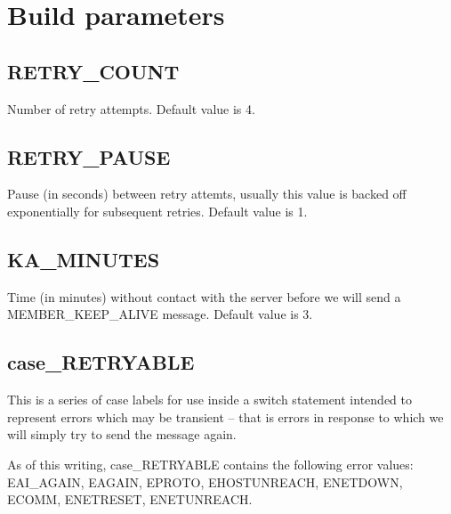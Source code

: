\documentclass{article}
\begin{document}
\section{Build parameters}
\label{sec:build}
\subsection{RETRY\_COUNT}
Number of retry attempts. Default value is 4.
\subsection{RETRY\_PAUSE}
Pause (in seconds) between retry attemts, usually this value is backed off
exponentially for subsequent retries. Default value is 1.
\subsection{KA\_MINUTES}
Time (in minutes) without contact with the server before we will send a
MEMBER\_KEEP\_ALIVE message. Default value is 3.
\subsection{case\_RETRYABLE}
\label{def:case}
This is a series of case labels for use inside a switch statement intended
to represent errors which may be transient -- that is errors in response to
which we will simply try to send the message again.

As of this writing, case\_RETRYABLE contains the following error values:
EAI\_AGAIN, EAGAIN, EPROTO, EHOSTUNREACH, ENETDOWN, ECOMM, ENETRESET,
ENETUNREACH.
\end{document}
